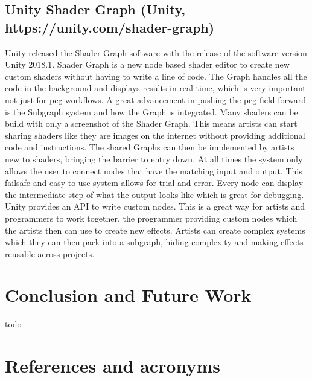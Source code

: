 \documentclass[10pt,a4paper]{article}
\begin{document}
\begin{multicols}{2}
\subsection{Unity Shader Graph (Unity, https://unity.com/shader-graph)}
Unity released the Shader Graph software with the release of the software version Unity 2018.1. Shader Graph is a new node based shader editor to create new custom shaders without having to write a line of code. The Graph handles all the code in the background and displays results in real time, which is very important not just for \gls{pcg} workflows. A great advancement in pushing the \gls{pcg} field forward is the Subgraph system and how the Graph is integrated. Many shaders can be build with only a screenshot of the Shader Graph. This means artists can start sharing shaders like they are images on the internet without providing additional code and instructions. The shared Graphs can then be implemented by artists new to shaders, bringing the barrier to entry down. At all times the system only allows the user to connect nodes that have the matching input and output. This failsafe and easy to use system allows for trial and error. Every node can display the intermediate step of what the output looks like which is great for debugging. Unity provides an API to write custom nodes. This is a great way for artists and programmers to work together, the programmer providing custom nodes which the artists then can use to create new effects. Artists can create complex systems which they can then pack into a subgraph, hiding complexity and making effects reusable across projects.
\end{multicols}

\section{Conclusion and Future Work}
\begin{multicols}{2}
todo
\end{multicols}

\section{References and acronyms}

\printglossaries


%
%

%


\listoffigures

\end{document}
